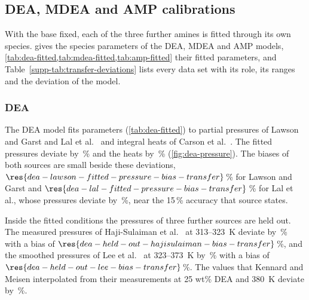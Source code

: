 \subsection{DEA, MDEA and AMP calibrations}\label{sec:results-transfer}
With the base fixed, each of the three further amines is fitted through its own species.
 gives the species parameters of the DEA, MDEA and AMP models, \cref{tab:dea-fitted,tab:mdea-fitted,tab:amp-fitted} their fitted parameters, and Table~\ref{supp-tab:transfer-deviations} lists every data set with its role, its ranges and the deviation of the model.



\subsubsection{DEA}\label{sec:results-dea}
The DEA model fits  parameters (\cref{tab:dea-fitted}) to  \COtwo partial pressures of Lawson and Garst \cite{lawsonGasSweeteningData1976} and Lal et al.\ \cite{lalSolubilityH2SCO21985} and  integral heats of Carson et al.\ \cite{carsonEnthalpySolutionCarbon2000}.
The fitted pressures deviate by \,\% and the heats by \,\% (\cref{fig:dea-pressure}).
The biases of both sources are small beside these deviations, $\res{dea-lawson-fitted-pressure-bias-transfer}$\,\% for Lawson and Garst and $\res{dea-lal-fitted-pressure-bias-transfer}$\,\% for Lal et al., whose pressures deviate by \,\%, near the 15\,\% accuracy that source states.



Inside the fitted conditions the pressures of three further sources are held out.
The  measured pressures of Haji-Sulaiman et al.\ \cite{haji-sulaimanAnalysisEquilibriumData1998} at 313--\SI{323}{\kelvin} deviate by \,\% with a bias of $\res{dea-held-out-hajisulaiman-bias-transfer}$\,\%, and the  smoothed pressures of Lee et al.\ \cite{leeSolubilityCarbonDioxide1972} at 323--\SI{373}{\kelvin} by \,\% with a bias of $\res{dea-held-out-lee-bias-transfer}$\,\%.
The  values that Kennard and Meisen interpolated from their measurements at 25 wt\% DEA and \SI{380}{\kelvin} \cite{kennardSolubilityCarbonDioxide1984} deviate by \,\%.

